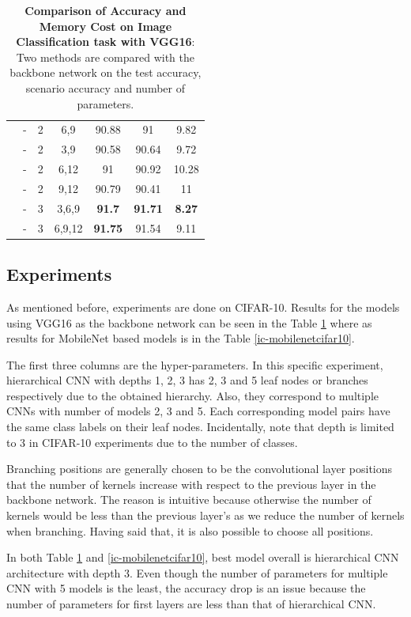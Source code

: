 \begin{table}[]
\begin{center}
\begin{tabular}{c||c|c|c||c|c|c}
\cline{2-7} 
& - & 2 & 6,9 & 90.88 & 91 & 9.82 \\ 
\cline{2-7} 
& - & 2 & 3,9 & 90.58 & 90.64 & 9.72 \\ 
\cline{2-7} 
& - & 2 & 6,12 & 91 & 90.92 & 10.28 \\ 
\cline{2-7} 
& - & 2 & 9,12 & 90.79 & 90.41 & 11 \\ 
\cline{2-7} 
& - & 3 & 3,6,9 & \textbf{91.7} & \textbf{91.71} & \textbf{8.27} \\ 
\cline{2-7} 
& - & 3 & 6,9,12 & \textbf{91.75} & 91.54 & 9.11                                                                   
\end{tabular}
\end{center}
\caption[Comparison of Accuracy and Memory Cost on Image Classification task with VGG16]{\textbf{Comparison of Accuracy and Memory Cost on Image Classification task with VGG16}: Two methods are compared with the backbone network on the test accuracy, scenario accuracy and number of parameters.}
\label{ic-vgg16cifar10}
\end{table}


\subsection{Experiments}
As mentioned before, experiments are done on CIFAR-10. Results for the models using VGG16 as the backbone network can be seen in the Table \ref{ic-vgg16cifar10} where as results for MobileNet based models is in the Table \ref{ic-mobilenetcifar10}. 

The first three columns are the hyper-parameters. 
In this specific experiment, hierarchical CNN with depths 1, 2, 3 has 2, 3 and 5 leaf nodes or branches respectively due to the obtained hierarchy.
Also, they correspond to multiple CNNs with number of models 2, 3 and 5. 
Each corresponding model pairs have the same class labels on their leaf nodes.
Incidentally, note that depth is limited to 3 in CIFAR-10 experiments due to the number of classes.

Branching positions are generally chosen to be the convolutional layer positions that the number of kernels increase with respect to the previous layer in the backbone network. 
The reason is intuitive because otherwise the number of kernels would be less than the previous layer's as we reduce the number of kernels when branching. 
Having said that, it is also possible to choose all positions.

In both Table \ref{ic-vgg16cifar10} and \ref{ic-mobilenetcifar10}, best model overall is hierarchical CNN architecture with depth 3. 
Even though the number of parameters for multiple CNN with 5 models is the least, the accuracy drop is an issue because the number of parameters for first layers are less than that of hierarchical CNN.



